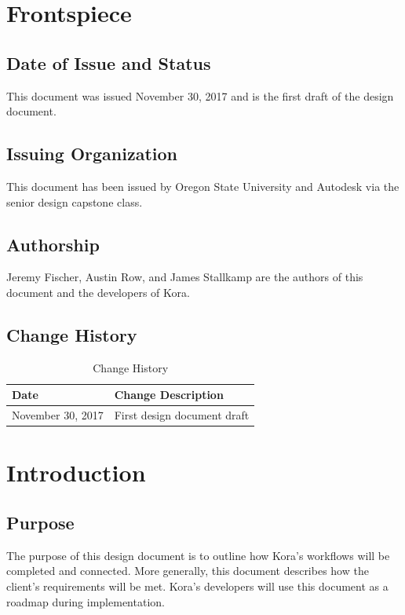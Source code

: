 \documentclass[onecolumn, draftclsnofoot,10pt, compsoc]{IEEEtran}
\begin{document}


\section{Frontspiece}
	\subsection{Date of Issue and Status}
		This document was issued November 30, 2017 and is the first draft of the design document.
	
	\subsection{Issuing Organization}
		This document has been issued by Oregon State University and Autodesk via the senior design capstone class.
	
	\subsection{Authorship}
		Jeremy Fischer, Austin Row, and James Stallkamp are the authors of this document and the developers of Kora.
		
	\subsection{Change History}
		\begin{table}[H]
			\centering
			\caption{Change History}
			\label{my-label}
			\begin{tabular}{|l|l|}
				\hline
				\textbf{Date}     & \textbf{Change Description}   \\ \hline
				November 30, 2017 & {First design document draft} \\ \hline
			\end{tabular}
		\end{table}

\section{Introduction}
	\subsection{Purpose}
		The purpose of this design document is to outline how Kora's workflows will be completed and connected.
		More generally, this document describes how the client's requirements will be met.
		Kora's developers will use this document as a roadmap during implementation.
\end{document}
